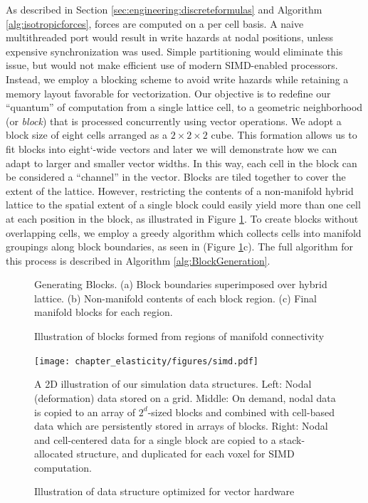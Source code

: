 As described in Section \ref{sec:engineering:discreteformulas} and Algorithm
\ref{alg:isotropicforces}, forces are computed on a per cell basis. A naive
multithreaded port would result in write hazards at nodal positions,
unless expensive synchronization was used. Simple partitioning would
eliminate this issue, but would not make efficient use of
modern SIMD-enabled processors. Instead, we employ a blocking scheme to avoid write
hazards while retaining a memory layout favorable for
vectorization. Our objective is to redefine our ``quantum'' of
computation from a single lattice cell, to a geometric neighborhood
(or \emph{block}) that is processed concurrently using vector
  operations.  We adopt a block size of eight cells
arranged as a $2\times 2\times 2$ cube. This formation
allows us to fit blocks into eight\char`-wide
vectors and later we will demonstrate how we can
adapt to larger and smaller vector widths. In this way,
each cell in the block can be considered a ``channel'' in the
vector.  Blocks are tiled together to cover the
  extent of the lattice. However, restricting the contents of a
  non-manifold hybrid lattice to the spatial extent of a single block
  could easily yield more than one cell at each position in the block,
  as illustrated in Figure \ref{fig:blocking}. To create blocks
  without overlapping cells, we employ a greedy algorithm which
  collects cells into manifold groupings along block boundaries, as
  seen in (Figure \ref{fig:blocking}c). The full algorithm for this
  process is described in Algorithm \ref{alg:BlockGeneration}.


\label{sec:blocking}
\begin{figure}[b!]
  \centering
  \def\svgwidth{\columnwidth}
 
  

\caption{Illustration of blocks formed from regions of manifold connectivity}{Generating Blocks. (a) Block boundaries superimposed over
hybrid lattice. (b) Non-manifold contents of each block region. (c)
Final manifold blocks for each region.}
\label{fig:blocking}
\end{figure}
  
\begin{figure}[t]
   \texttt{[image: chapter\_elasticity/figures/simd.pdf]}
  
   \caption{Illustration of data structure optimized for vector
     hardware}{A 2D illustration of our simulation data
     structures. Left: Nodal (deformation) data stored on a
     grid. Middle: On demand, nodal data is copied to an array of
     $2^d$-sized blocks and combined with cell-based data which are
     persistently stored in arrays of blocks. Right: Nodal and
     cell-centered data for a single block are copied to a
     stack-allocated structure, and duplicated for each voxel for SIMD
     computation.}
   \label{fig:simd}

\end{figure}
  
